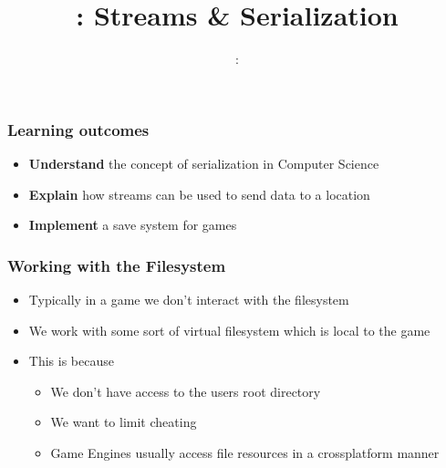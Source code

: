 \usepackage{../../beamerthemeFalmouthGamesAcademy}
\usepackage{multimedia}
\graphicspath{ {../../} }


\usepackage[normalem]{ulem}
\usepackage{wasysym}
\usepackage{listings}
\usepackage{pdfpages}

\usetikzlibrary{arrows,automata}




\title{\sessionnumber: Streams \& Serialization}
\subtitle{\modulecode: \moduletitle}

\frame{\titlepage}

\begin{frame}
	\frametitle{Learning outcomes}
	\begin{itemize}
		\item \textbf{Understand} the concept of serialization in Computer Science
		\item \textbf{Explain} how streams can be used to send data to a location
		\item \textbf{Implement} a save system for games
	\end{itemize}
\end{frame}

\begin{frame}
	\frametitle{Working with the Filesystem}
	\begin{itemize}
		\item Typically in a game we don't interact with the filesystem
		\item We work with some sort of virtual filesystem which is local to the game
		\item This is because
		\begin{itemize}
				\item We don't have access to the users root directory
				\item We want to limit cheating
				\item Game Engines usually access file resources in a crossplatform manner
		\end{itemize}
	\end{itemize}
\end{frame}

